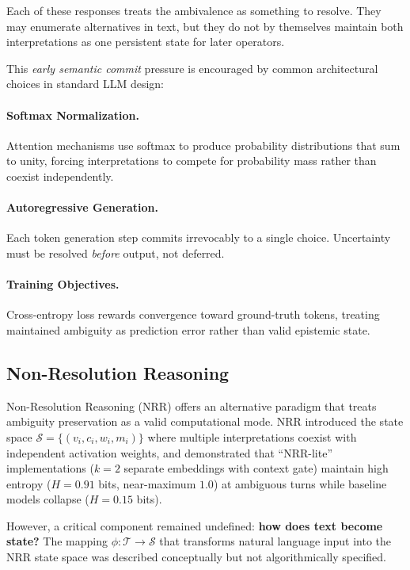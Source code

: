 \documentclass[11pt,a4paper]{article}
\begin{document}
Each of these responses treats the ambivalence as something to resolve. They may
enumerate alternatives in text, but they do not by themselves maintain both
interpretations as one persistent state for later operators.

This \textit{early semantic commit} pressure is encouraged by common architectural
choices in standard LLM design:

\paragraph{Softmax Normalization.}
Attention mechanisms use softmax to produce probability distributions that sum to unity, 
forcing interpretations to compete for probability mass rather than coexist independently.

\paragraph{Autoregressive Generation.}
Each token generation step commits irrevocably to a single choice. Uncertainty must be 
resolved \textit{before} output, not deferred.

\paragraph{Training Objectives.}
Cross-entropy loss rewards convergence toward ground-truth tokens, treating maintained 
ambiguity as prediction error rather than valid epistemic state.

\subsection{Non-Resolution Reasoning}

Non-Resolution Reasoning (NRR) \cite{saito2025nrr} offers an alternative paradigm that 
treats ambiguity preservation as a valid computational mode. NRR introduced the state 
space $\mathcal{S} = \{(v_i, c_i, w_i, m_i)\}$ where multiple interpretations coexist with 
independent activation weights, and demonstrated that ``NRR-lite'' 
implementations ($k{=}2$ separate embeddings with context gate) maintain high entropy 
($H = 0.91$ bits, near-maximum $1.0$) at ambiguous turns while baseline 
models collapse ($H = 0.15$ bits).

However, a critical component remained undefined: \textbf{how does text become state?} 
The mapping $\phi: \mathcal{T} \to \mathcal{S}$ that transforms natural language input 
into the NRR state space was described conceptually but not algorithmically specified.
\end{document}
